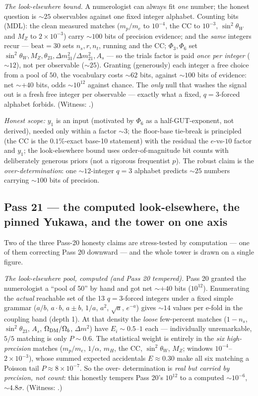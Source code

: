 \documentclass[11pt]{article}
\begin{document}
\emph{The look-elsewhere bound.} A numerologist can always fit \emph{one} number; the honest
question is $\sim25$ observables against one fixed integer alphabet. Counting bits (MDL): the
clean measured matches ($m_p/m_e$ to $10^{-4}$, the CC to $10^{-3}$, $\sin^2\theta_W$ and $M_Z$
to $2\times10^{-3}$) carry $\sim100$ bits of precision evidence; and the \emph{same} integers
recur --- $\mathrm{beat}=30$ sets $n_s,r,n_t$, running and the CC; $\Phi_3,\Phi_6$ set
$\sin^2\theta_W,M_Z,\theta_{23},\Delta m^2_{31}/\Delta m^2_{21},A_s$ --- so the trials factor is
paid \emph{once per integer} ($\sim12$), not per observable ($\sim25$). Granting (generously)
each integer a free choice from a pool of $50$, the vocabulary costs $\sim62$ bits, against
$\sim100$ bits of evidence: net $\sim+40$ bits, odds $\sim10^{12}$ against chance. The \emph{only}
null that washes the signal out is a fresh free integer per observable --- exactly what a fixed,
$q=3$-forced alphabet forbids. (Witness: .)

\emph{Honest scope:} $y_1$ is an input (motivated by $\Phi_6$ as a half-GUT-exponent, not
derived), needed only within a factor $\sim3$; the floor-base tie-break is principled (the CC is
the $0.1\%$-exact base-10 statement) with the residual the $e$-vs-$10$ factor and $y_1$; the
look-elsewhere bound uses order-of-magnitude bit counts with deliberately generous priors (not a
rigorous frequentist $p$). The robust claim is the \emph{over-determination}: one $\sim12$-integer
$q=3$ alphabet predicts $\sim25$ numbers carrying $\sim100$ bits of precision.

\subsection{Pass 21 --- the computed look-elsewhere, the pinned Yukawa, and the tower on one axis}
\label{sec:capstone-twentyone}

Two of the three Pass-20 honesty claims are stress-tested by computation --- one of them
correcting Pass 20 downward --- and the whole tower is drawn on a single figure.

\emph{The look-elsewhere pool, computed (and Pass 20 tempered).} Pass 20 granted the
numerologist a ``pool of 50'' by hand and got net $\sim+40$ bits ($10^{12}$). Enumerating the
\emph{actual} reachable set of the 13 $q=3$-forced integers under a fixed simple grammar ($a/b$,
$a{\cdot}b$, $a{\pm}b$, $1/a$, $a^2$, $\sqrt a$, $e^{-a}$) gives $\sim14$ values per e-fold in the
coupling band (depth 1). At that density the \emph{loose} few-percent matches ($1{-}n_s$,
$\sin^2\theta_{23}$, $A_s$, $\Omega_{\rm DM}/\Omega_b$, $\Delta m^2$) have $E_i\sim0.5$--$1$ each
--- individually unremarkable, $5/5$ matching is only $P\sim0.6$. The statistical weight is
entirely in the \emph{six high-precision} matches ($m_p/m_e$, $1/\alpha$, $m_H$, the CC,
$\sin^2\theta_W$, $M_Z$; windows $10^{-4}$--$2\times10^{-3}$), whose summed expected accidentals
$E\approx0.30$ make all six matching a Poisson tail $P\approx8\times10^{-7}$. So the over-
determination is \emph{real but carried by precision, not count}: this honestly tempers Pass 20's
$10^{12}$ to a computed $\sim10^{-6}$, $\sim4.8\sigma$. (Witness:
.)
\end{document}
